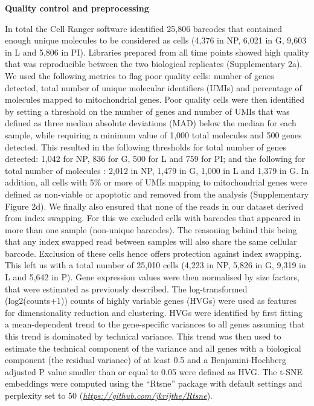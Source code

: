 \documentclass[titlepage, 12pt, oneside]{amsart}
\begin{document}
\textbf{Quality control and preprocessing}

In total the Cell Ranger software identified 25,806 barcodes that contained enough unique molecules to be considered as cells (4,376 in NP, 6,021 in G, 9,603 in L and 5,806 in PI).
Libraries prepared from all time points showed high quality that was reproducible between the two biological replicates (Supplementary 2a).
We used the following metrics to flag poor quality cells: number of genes detected, total number of unique molecular identifiers (UMIs) and percentage of molecules mapped to mitochondrial genes.
Poor quality cells were then identified by setting a threshold on the number of genes and number of UMIs that was defined as three median absolute deviations (MAD) below the median for each sample, while requiring a minimum value of 1,000 total molecules and 500 genes detected.  
This resulted in the following thresholds for total number of genes detected: 1,042 for NP, 836 for G, 500 for L and 759 for PI; and the following for total number of molecules : 2,012 in NP, 1,479 in G, 1,000 in L and 1,379 in G.
In addition, all cells with 5\% or more of UMIs mapping to mitochondrial genes were defined as non-viable or apoptotic and removed from the analysis (Supplementary Figure 2d).
We finally also ensured that none of the reads in our dataset derived from index swapping\autocite{Sinha2017, Griffiths2017}.
For this we excluded cells with barcodes that appeared in more than one sample (non-unique barcodes).
The reasoning behind this being that any index swapped read between samples will also share the same cellular barcode.
Exclusion of these cells hence offers protection against index swapping.
This left us with a total number of 25,010 cells (4,223 in NP, 5,826 in G, 9,319 in L and 5,642 in P).
Gene expression values were then normalised by size factors, that were estimated as previously described\autocite{Lun2016}.
The log-transformed (log2(counts+1)) counts of highly variable genes (HVGs) were used as features for dimensionality reduction and clustering.
HVGs were identified by first fitting a mean-dependent trend to the gene-specific variances to all genes assuming that this trend is dominated by technical variance.
This trend was then used to estimate the technical component of the variance and all genes with a biological component (the residual variance) of at least 0.5 and a Benjamini-Hochberg adjusted P value smaller than or equal to 0.05 were defined as HVG.
The t-SNE embeddings were computed using the ``Rtsne'' package with default settings and perplexity set to 50 (\href{https://github.com/jkrijthe/Rtsne}{\textit{https://github.com/jkrijthe/Rtsne}}).
\end{document}
